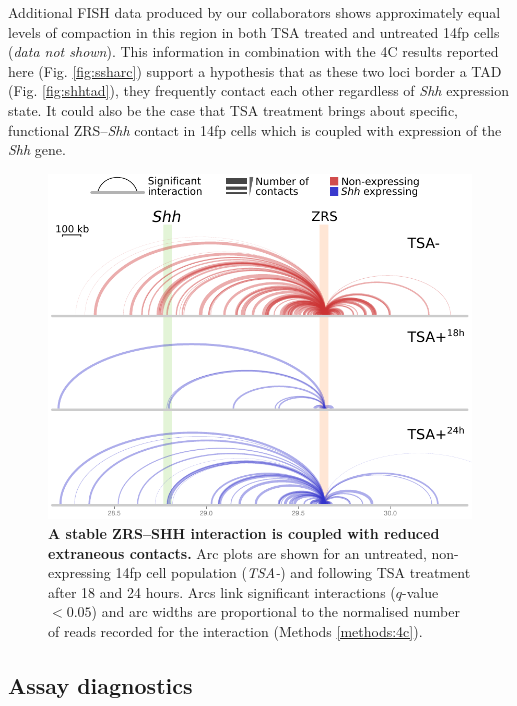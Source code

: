 \documentclass[a4paper,11pt,oneside]{book}
\begin{document}
Additional FISH data produced by our collaborators shows approximately equal levels of compaction in this region in both TSA treated and untreated 14fp cells (\emph{data not shown}). This information in combination with the 4C results reported here (Fig. \ref{fig:ssharc}) support a hypothesis that as these two loci border a TAD (Fig. \ref{fig:shhtad}), they frequently contact each other regardless of \emph{Shh} expression state. It could also be the case that TSA treatment brings about specific, functional ZRS--\emph{Shh} contact in 14fp cells which is coupled with expression of the \emph{Shh} gene.

\begin{figure}
\begin{center} 
\includegraphics[width=4.6in]{figs/4cArcs_v2.pdf}
\captionsetup{width=\textwidth} 
\caption[ A stable ZRS--SHH interaction is coupled with reduced extraneous contacts. ]{ {\bf A stable ZRS--SHH interaction is coupled with reduced extraneous contacts. }
Arc plots are shown for an untreated, non-expressing 14fp cell population (\emph{TSA-}) and following TSA treatment after 18 and 24 hours. Arcs link significant interactions ($q$-value $< 0.05$) and arc widths are proportional to the normalised number of reads recorded for the interaction (Methods \ref{methods:4c}).
}\label{fig:4carcs}
\end{center} 
\end{figure} 

\subsection{Assay diagnostics}
\end{document}
